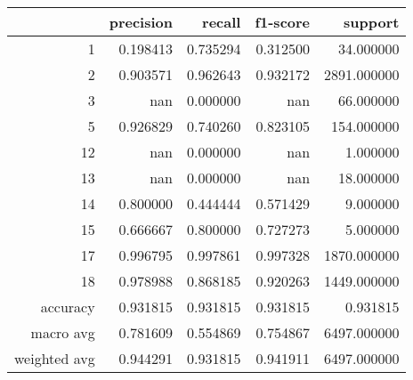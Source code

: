 \begin{tabular}{rrrrr}
\toprule
 & precision & recall & f1-score & support \\
\midrule
1 & 0.198413 & 0.735294 & 0.312500 & 34.000000 \\
2 & 0.903571 & 0.962643 & 0.932172 & 2891.000000 \\
3 & nan & 0.000000 & nan & 66.000000 \\
5 & 0.926829 & 0.740260 & 0.823105 & 154.000000 \\
12 & nan & 0.000000 & nan & 1.000000 \\
13 & nan & 0.000000 & nan & 18.000000 \\
14 & 0.800000 & 0.444444 & 0.571429 & 9.000000 \\
15 & 0.666667 & 0.800000 & 0.727273 & 5.000000 \\
17 & 0.996795 & 0.997861 & 0.997328 & 1870.000000 \\
18 & 0.978988 & 0.868185 & 0.920263 & 1449.000000 \\
accuracy & 0.931815 & 0.931815 & 0.931815 & 0.931815 \\
macro avg & 0.781609 & 0.554869 & 0.754867 & 6497.000000 \\
weighted avg & 0.944291 & 0.931815 & 0.941911 & 6497.000000 \\
\bottomrule
\end{tabular}
